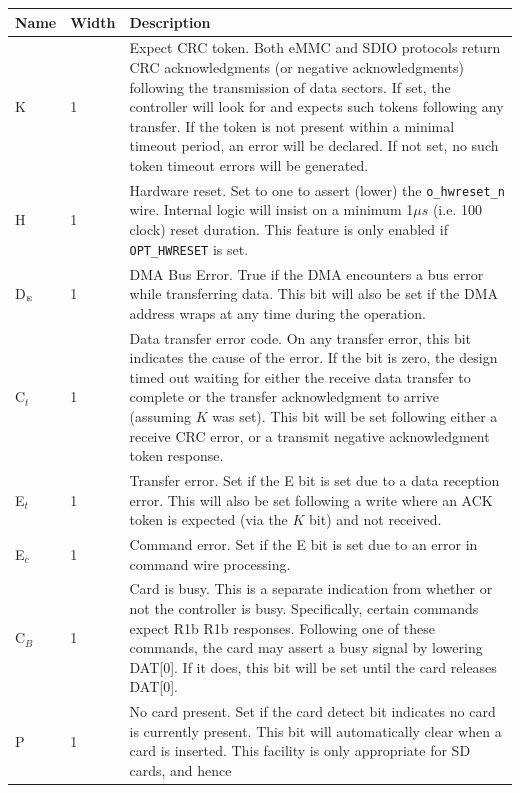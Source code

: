 \documentclass{gqtekspec}
\begin{document}
\begin{table}\begin{center}
\begin{tabular}{|p{1.2in}|p{0.5in}|p{4.0in}|}\hline
	\rowcolor[gray]{0.85} Name & Width & Description\\\hline\hline
K &1& Expect CRC token.  Both eMMC and SDIO protocols return CRC acknowledgments
	(or negative acknowledgments) following the transmission of data
	sectors.  If set, the controller will look for and expects
	such tokens following any transfer.  If the token is not present within
	a minimal timeout period, an error will be declared.  If not set, no
	such token timeout errors will be generated.  \\
H &1& Hardware reset.  Set to one to assert (lower) the {\tt o\_hwreset\_n}
	wire.  Internal logic will insist on a minimum 1$\mu s$
	(i.e. 100 clock) reset duration.  This feature is only enabled if
	{\tt OPT\_HWRESET} is set.\\
D$_{\mbox{\tiny E}}$&1& DMA Bus Error.  True if the DMA encounters a bus error
	while transferring data.  This bit will also be set if the DMA address
	wraps at any time during the operation. \\
C$_t$&1& Data transfer error code.  On any transfer error, this bit indicates
	the cause of the error.  If the bit is zero, the design timed out
	waiting for either the receive data transfer to complete or the
	transfer acknowledgment to arrive (assuming $K$ was set).  This bit
	will be set following either a receive CRC error, or a transmit
	negative acknowledgment token response. \\
E$_t$&1& Transfer error.  Set if the E bit is set due to a data reception error.
	This will also be set following a write where an ACK token is expected
	(via the $K$ bit) and not received.
	\\
E$_c$&1& Command error.  Set if the E bit is set due to an error in command
	wire processing.  \\
C$_B$&1& Card is busy.  This is a separate indication from whether or not the
	controller is busy.  Specifically, certain commands expect R1b
	R1b responses.  Following one of these commands, the card may assert a
	busy signal by lowering DAT[0].  If it does, this bit will be set
	until the card releases DAT[0].\\
P & 1 & No card present.  Set if the card detect bit indicates no card is
	currently present.  This bit will automatically clear when a card
	is inserted.  This facility is only appropriate for SD cards, and hence

\end{tabular}
\end{center}
\end{table}
\end{document}
